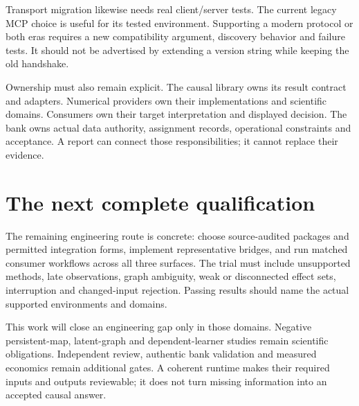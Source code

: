 Transport migration likewise needs real client/server tests. The current legacy
MCP choice is useful for its tested environment. Supporting a modern protocol
or both eras requires a new compatibility argument, discovery behavior and
failure tests. It should not be advertised by extending a version string while
keeping the old handshake.

Ownership must also remain explicit. The causal library owns its result
contract and adapters. Numerical providers own their implementations and
scientific domains. Consumers own their target interpretation and displayed
decision. The bank owns actual data authority, assignment records, operational
constraints and acceptance. A report can connect those responsibilities; it
cannot replace their evidence.

\section{The next complete qualification}

The remaining engineering route is concrete: choose source-audited packages
and permitted integration forms, implement representative bridges, and run
matched consumer workflows across all three surfaces. The trial must include
unsupported methods, late observations, graph ambiguity, weak or disconnected
effect sets, interruption and changed-input rejection. Passing results should
name the actual supported environments and domains.

This work will close an engineering gap only in those domains. Negative
persistent-map, latent-graph and dependent-learner studies remain scientific
obligations. Independent review, authentic bank validation and measured
economics remain additional gates. A coherent runtime makes their required
inputs and outputs reviewable; it does not turn missing information into an
accepted causal answer.
